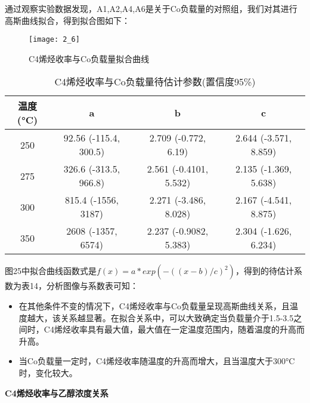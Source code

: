 \documentclass[withoutpreface,bwprint]{cumcmthesis} %
\begin{document}
通过观察实验数据发现，A1,A2,A4,A6是关于Co负载量的对照组，我们对其进行高斯曲线拟合，得到拟合图如下：
\begin{figure}[!h]
	\centering
	\texttt{[image: 2\_6]}
	\caption{C4烯烃收率与Co负载量拟合曲线}
	\label{fig:circuit-diagram1}
\end{figure}
\begin{table}[!htbp]
	\caption{C4烯烃收率与Co负载量待估计参数(置信度95\%)}\label{tab:001} \centering
	\begin{tabular}{cccc}
		\toprule[1.5pt]
		温度(°C) & a & b & c \\
		\midrule[1pt]
		250 &  92.56  (-115.4, 300.5) &  2.709  (-0.772, 6.19) &  2.644  (-3.571, 8.859) \\
		275 & 326.6  (-313.5, 966.8) &   2.561  (-0.4101, 5.532) &2.135  (-1.369, 5.638) \\
		300 &815.4  (-1556, 3187) &2.271  (-3.486, 8.028) &   2.167  (-4.541, 8.875) \\
		350 &  2608  (-1357, 6574) & 2.237  (-0.9082, 5.383) & 2.304  (-1.626, 6.234) \\
		\bottomrule[1.5pt]
	\end{tabular}
\end{table}

图25中拟合曲线函数式是$f(x) =  a*exp(-((x-b)/c)^2)$，得到的待估计系数为表14，分析图像与系数表可知：
\begin{itemize}
	\item 在其他条件不变的情况下，C4烯烃收率与Co负载量呈现高斯曲线关系，且温度越大，该关系越显著。在拟合关系中，可以大致确定当负载量介于1.5-3.5之间时，C4烯烃收率具有最大值，最大值在一定温度范围内，随着温度的升高而升高。
	\item 当Co负载量一定时，C4烯烃收率随温度的升高而增大，且当温度大于300°C时，变化较大。
\end{itemize}


\textbf{C4烯烃收率与乙醇浓度关系}
\end{document}
